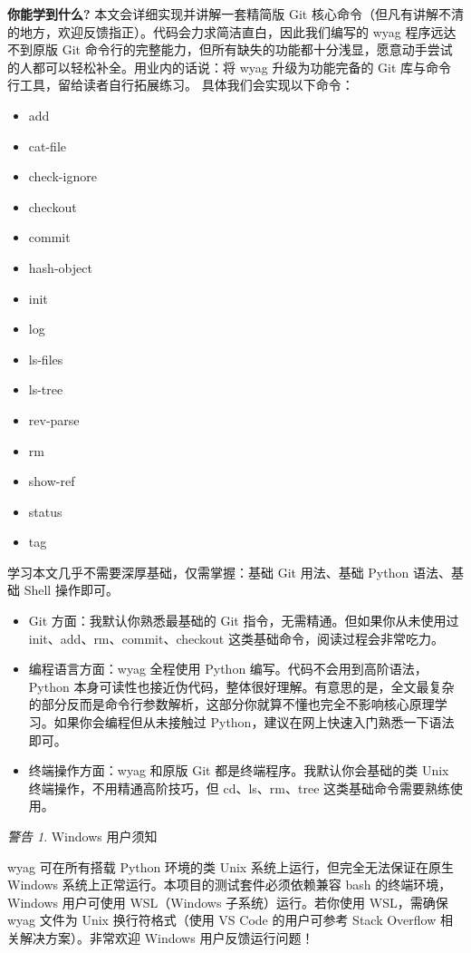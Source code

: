 \documentclass{ctexart}
\theoremstyle{remark}
\theoremstyle{warningstyle}
\newtheorem*{warning}{警告} %
\theoremstyle{warningstyle}
\begin{document}
\textbf{你能学到什么?}
本文会详细实现并讲解一套精简版 Git 核心命令（但凡有讲解不清的地方，欢迎反馈指正）。代码会力求简洁直白，因此我们编写的 wyag 程序远达不到原版 Git 命令行的完整能力，但所有缺失的功能都十分浅显，愿意动手尝试的人都可以轻松补全。用业内的话说：将 wyag 升级为功能完备的 Git 库与命令行工具，留给读者自行拓展练习。
具体我们会实现以下命令：
  \begin{itemize}
    \item add
    \item cat-file
    \item check-ignore
    \item checkout
    \item commit
    \item hash-object
    \item init
    \item log
    \item ls-files
    \item ls-tree
    \item rev-parse
    \item rm
    \item show-ref
    \item status
    \item tag
  \end{itemize}
学习本文几乎不需要深厚基础，仅需掌握：基础 Git 用法、基础 Python 语法、基础 Shell 操作即可。
\begin{itemize}
    \item Git 方面：我默认你熟悉最基础的 Git 指令，无需精通。但如果你从未使用过 init、add、rm、commit、checkout 这类基础命令，阅读过程会非常吃力。
    \item 编程语言方面：wyag 全程使用 Python 编写。代码不会用到高阶语法，Python 本身可读性也接近伪代码，整体很好理解。有意思的是，全文最复杂的部分反而是命令行参数解析，这部分你就算不懂也完全不影响核心原理学习。如果你会编程但从未接触过 Python，建议在网上快速入门熟悉一下语法即可。
    \item 终端操作方面：wyag 和原版 Git 都是终端程序。我默认你会基础的类 Unix 终端操作，不用精通高阶技巧，但 cd、ls、rm、tree 这类基础命令需要熟练使用。
\end{itemize}
\begin{warning}
Windows 用户须知

wyag 可在所有搭载 Python 环境的类 Unix 系统上运行，但完全无法保证在原生 Windows 系统上正常运行。本项目的测试套件必须依赖兼容 bash 的终端环境，Windows 用户可使用 WSL（Windows 子系统）运行。若你使用 WSL，需确保 wyag 文件为 Unix 换行符格式（使用 VS Code 的用户可参考 Stack Overflow 相关解决方案）。非常欢迎 Windows 用户反馈运行问题！
\end{warning}
\end{document}

